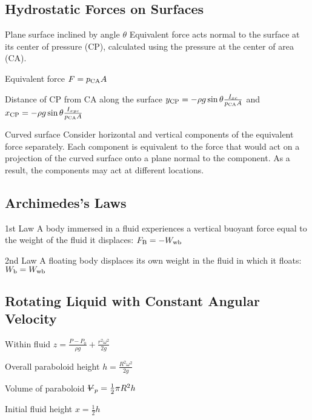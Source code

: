 \documentclass{article}
\begin{document}
\subsection{Hydrostatic Forces on Surfaces}
\begin{description*}
\item[Plane surface inclined by angle $\theta$] Equivalent force acts normal to the surface at its
  center of pressure (CP), calculated using the pressure at the center of area (CA).
  \begin{description*}
  \item[Equivalent force]
    \(F = p_{\mathrm{CA}}A\)
  \item[Distance of CP from CA along the surface]
    \(y_{\mathrm{CP}} = -\rho g \sin\theta\frac{I_{xc}}{p_{\mathrm{CA}}A}\) and
    \(x_{\mathrm{CP}} = -\rho g \sin\theta\frac{I_{xyc}}{p_{\mathrm{CA}}A}\)
  \end{description*}
\item[Curved surface] Consider horizontal and vertical components of the equivalent force
  separately. Each component is equivalent to the force that would act on a projection of the curved
  surface onto a plane normal to the component. As a result, the components may act at different
  locations.
\end{description*}

\subsection{Archimedes's Laws}
\begin{description*}
\item[1st Law] A body immersed in a fluid experiences a vertical buoyant force equal to the weight
  of the fluid it displaces: \(F_{\mathrm{B}} = -W_{\mathrm{wb}}\)
\item[2nd Law] A floating body displaces its own weight in the fluid in which it floats:
  \(W_{\mathrm{b}} = W_{\mathrm{wb}}\)
\end{description*}

\subsection{Rotating Liquid with Constant Angular Velocity}
\begin{description*}
\item[Within fluid]
  \(z = \frac{P-P_0}{\rho g} + \frac{r^2\omega^2}{2g}\)
\item[Overall paraboloid height]
  \(h = \frac{R^2\omega^2}{2g}\)
\item[Volume of paraboloid]
  \(\volsym_p = \frac{1}{2} \pi R^2 h\)
\item[Initial fluid height]
  \(x = \frac{1}{2} h\)
\end{description*}
\end{document}
